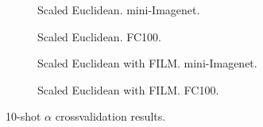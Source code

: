 \documentclass{article}
\begin{document}
\begin{figure}[t]
    \centering
    \begin{subfigure}[t]{0.49\textwidth}
        \caption{Scaled Euclidean. mini-Imagenet.}
        \label{fig:scaled_euclidean_miniimagenet_10shot}
    \end{subfigure}
    \begin{subfigure}[t]{0.49\textwidth}
        \caption{Scaled Euclidean. FC100.}
        \label{fig:scaled_euclidean_cifar100_10shot}
    \end{subfigure}
    \begin{subfigure}[t]{0.49\textwidth}
        \caption{Scaled Euclidean with FILM. mini-Imagenet.}
        \label{fig:scaled_euclidean_with_tbn_miniimagenet_10shot}
    \end{subfigure}
    \begin{subfigure}[t]{0.49\textwidth}
        \caption{Scaled Euclidean with FILM. FC100.}
        \label{fig:scaled_euclidean_with_tbn_cifar100_10shot}
    \end{subfigure}
    \caption{10-shot $\alpha$ crossvalidation results.}
    \label{fig:metric_scaling_10shot}
\end{figure}
\fi
\end{document}
